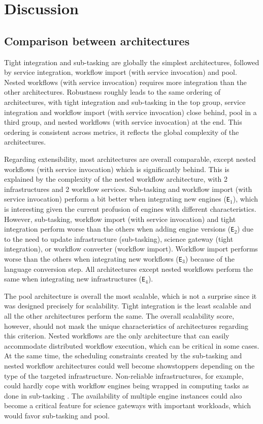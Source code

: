 \documentclass[preprint,3p,twocolumn]{elsarticle}
\newcommand{\note}[2]{\pdfmargincomment[color=yellow,author=#1,open=true]{#2}}
\begin{document}
\section{Discussion}

\subsection{Comparison between architectures}

Tight integration and sub-tasking are globally the simplest
architectures, followed by service integration, workflow import (with
service invocation) and pool. Nested workflows (with service
invocation) requires more integration than the other
architectures. Robustness roughly leads to the same ordering of
architectures, with tight integration and sub-tasking in the top
group, service integration and workflow import (with service
invocation) close behind, pool in a third group, and nested workflows
(with service invocation) at the end. This ordering is consistent
across metrics, it reflects the global complexity of the
architectures.

Regarding extensibility, most architectures are overall comparable,
except nested workflows (with service invocation) which is
significantly behind. This is explained by the complexity of the
nested workflow architecture, with 2 infrastructures and 2 workflow
services. Sub-tasking and workflow import (with service invocation)
perform a bit better when integrating new engines (\texttt{E$_1$}),
which is interesting given the current profusion of engines with
different characteristics.  However, sub-tasking, workflow import
(with service invocation) and tight integration perform worse than the
others when adding engine versions (\texttt{E$_2$}) due to the need to
update infrastructure \note{Marc-e}{confusion with
  physical?}(sub-tasking), science gateway (tight integration), or
workflow converter (workflow import). Workflow import performs worse
than the others when integrating new workflows (\texttt{E$_3$})
because of the language conversion step. All architectures except
nested workflows perform the same when integrating new infrastructures
(\texttt{E$_4$}).

The pool architecture is overall the most scalable, which is not a
surprise since it was designed precisely for scalability. Tight
integration is the least scalable and all the other architectures
perform the same. The overall scalability score, however, should not
mask the unique characteristics of architectures regarding this
criterion. Nested workflows are the only architecture that can easily
accommodate distributed workflow execution, which can be critical in
some cases. At the same time, the scheduling constraints created by
the sub-tasking and nested workflow architectures could well become
showstoppers depending on the type of the targeted
infrastructure. Non-reliable infrastructures, for example, could
hardly cope with workflow engines being wrapped in computing tasks as
done in sub-tasking \note{Marc-e}{free for all? WE dev involved?}. The availability of multiple engine instances
could also become a critical feature for science gateways with
important workloads, which would favor sub-tasking and pool.
\end{document}
